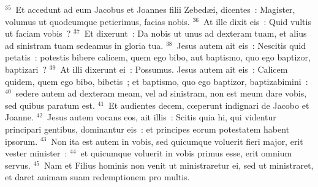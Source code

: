 ${}^{35}$~Et accedunt ad eum Jacobus et Joannes filii Zebed\ae i, dicentes~: Magister, volumus ut quodcumque petierimus, facias nobis.
${}^{36}$~At ille dixit eis~: Quid vultis ut faciam vobis~?
${}^{37}$~Et dixerunt~: Da nobis ut unus ad dexteram tuam, et alius ad sinistram tuam sedeamus in gloria tua.
${}^{38}$~Jesus autem ait eis~: Nescitis quid petatis~: potestis bibere calicem, quem ego bibo, aut baptismo, quo ego baptizor, baptizari~?
${}^{39}$~At illi dixerunt ei~: Possumus. Jesus autem ait eis~: Calicem quidem, quem ego bibo, bibetis~; et baptismo, quo ego baptizor, baptizabimini~:
${}^{40}$~sedere autem ad dexteram meam, vel ad sinistram, non est meum dare vobis, sed quibus paratum est.
${}^{41}$~Et audientes decem, cœperunt indignari de Jacobo et Joanne.
${}^{42}$~Jesus autem vocans eos, ait illis~: Scitis quia hi, qui videntur principari gentibus, dominantur eis~: et principes eorum potestatem habent ipsorum.
${}^{43}$~Non ita est autem in vobis, sed quicumque voluerit fieri major, erit vester minister~:
${}^{44}$~et quicumque voluerit in vobis primus esse, erit omnium servus.
${}^{45}$~Nam et Filius hominis non venit ut ministraretur ei, sed ut ministraret, et daret animam suam redemptionem pro multis.


